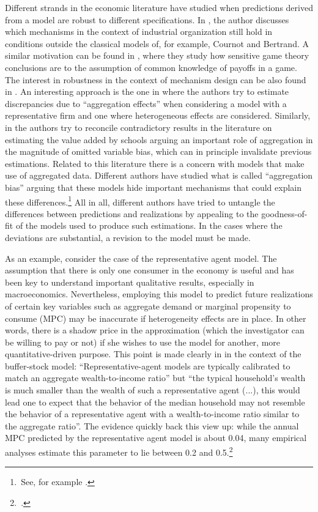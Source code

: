 \documentclass[english, a4paper, 12pt]{article}
\begin{document}
Different strands in the economic literature have studied when predictions derived from a model are robust to different specifications. In \cite{SuttonMarketStruct}, the author discusses which mechanisms in the context of industrial organization still hold in conditions outside the classical models of, for example, Cournot and Bertrand. A similar motivation can be found in \cite{Morris97}, where they study how sensitive game theory conclusions are to the assumption of common knowledge of payoffs in a game. The interest in robustness in the context of mechanism design can be also found in \cite{Morris2011}. An interesting approach is the one in \cite{Basu97} where the authors try to estimate discrepancies due to ``aggregation effects'' when considering a model with a representative firm and one where heterogeneous effects are considered. Similarly, in \cite{SchoolAggregation} the authors try to reconcile contradictory results in the literature on estimating the value added by schools arguing an important role of aggregation in the magnitude of omitted variable bias, which can in principle invalidate previous estimations. Related to this literature there is a concern with models that make use of aggregated data. Different authors have studied what is called ``aggregation bias'' arguing that these models hide important mechanisms that could explain these differences.\footnote{\,See, for example \cite{Agg1, Agg2, Agg3, Agg4}.} All in all, different authors have tried to untangle the differences between predictions and realizations by appealing to the goodness-of-fit of the models used to produce such estimations. In the cases where the deviations are substantial, a revision to the model must be made.

As an example, consider the case of the representative agent model. The assumption that there is only one consumer in the economy is useful and has been key to understand important qualitative results, especially in macroeconomics. Nevertheless, employing this model to predict future realizations of certain key variables such as aggregate demand or marginal propensity to consume (MPC) may be inaccurate if heterogeneity effects are in place. In other words, there is a shadow price in the approximation (which the investigator can be willing to pay or not) if she wishes to use the model for another, more quantitative-driven purpose. This point is made clearly in \cite{CarrollRequiem} in the context of the buffer-stock model: ``Representative-agent models are typically calibrated to match an aggregate wealth-to-income ratio'' but ``the typical household’s wealth is much smaller than the wealth of such a representative agent (...), this would lead one to expect that the behavior of the median household may not resemble the behavior of a representative agent with a wealth-to-income ratio similar to the aggregate ratio''. The evidence quickly back this view up: while the annual MPC predicted by the representative agent model is about 0.04, many empirical analyses estimate this parameter to lie between 0.2 and 0.5.\footnote{\,\cite{CarrollRequiem}.} 
\end{document}
